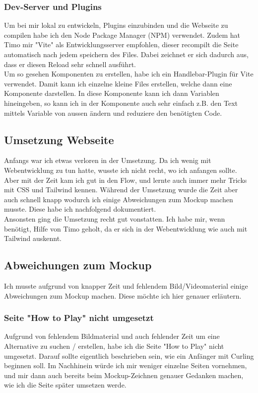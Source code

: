 \documentclass[11pt]{article}
\begin{document}
    \subsubsection{Dev-Server und Plugins}
    Um bei mir lokal zu entwickeln, Plugins einzubinden und die Webseite zu compilen habe ich den Node Package Manager (NPM) verwendet.
    Zudem hat Timo mir "Vite" als Entwicklungsserver empfohlen, dieser recompilt die Seite automatisch nach jedem speichern des Files.
    Dabei zeichnet er sich dadurch aus, dass er diesen Reload sehr schnell ausführt.\\
    Um so gesehen Komponenten zu erstellen, habe ich ein Handlebar-Plugin für Vite verwendet. Damit kann ich einzelne kleine Files erstellen,
    welche dann eine Komponente darstellen. In diese Komponente kann ich dann Variablen hineingeben, so kann ich in der Komponente auch sehr
    einfach z.B. den Text mittels Variable von aussen ändern und reduziere den benötigten Code.

    \subsection{Umsetzung Webseite}
    Anfangs war ich etwas verloren in der Umsetzung. Da ich wenig mit Webentwicklung zu tun hatte, wusste ich nicht recht, wo ich anfangen sollte.
    Aber mit der Zeit kam ich gut in den Flow, und lernte auch immer mehr Tricks mit CSS und Tailwind kennen. Während der Umsetzung wurde die Zeit
    aber auch schnell knapp wodurch ich einige Abweichungen zum Mockup machen musste. Diese habe ich nachfolgend dokumentiert.\\
    Ansonsten ging die Umsetzung recht gut vonstatten. Ich habe mir, wenn benötigt, Hilfe von Timo geholt, da er sich in der Webentwicklung wie auch
    mit Tailwind auskennt.

    \subsection{Abweichungen zum Mockup}
    Ich musste aufgrund von knapper Zeit und fehlendem Bild/Videomaterial einige Abweichungen zum Mockup machen. Diese möchte ich hier genauer erläutern.

    \subsubsection{Seite "How to Play" nicht umgesetzt}
    Aufgrund von fehlendem Bildmaterial und auch fehlender Zeit um eine Alternative zu suchen / erstellen, habe ich die Seite "How to Play" nicht umgesetzt.
    Darauf sollte eigentlich beschrieben sein, wie ein Anfänger mit Curling beginnen soll. Im Nachhinein würde ich mir weniger einzelne Seiten vornehmen, und
    mir dann auch bereits beim Mockup-Zeichnen genauer Gedanken machen, wie ich die Seite später umsetzen werde.
\end{document}
